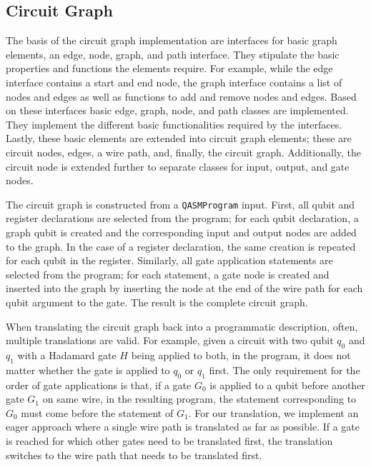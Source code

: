 \subsection{Circuit Graph}
The basis of the circuit graph implementation are interfaces for basic graph elements, \ie an edge, node, graph, and path interface. They stipulate the basic properties and functions the elements require. For example, while the edge interface contains a start and end node, the graph interface contains a list of nodes and edges as well as functions to add and remove nodes and edges. Based on these interfaces basic edge, graph, node, and path classes are implemented. They implement the different basic functionalities required by the interfaces. Lastly, these basic elements are extended into circuit graph elements; these are circuit nodes, edges, a wire path, and, finally, the circuit graph. Additionally, the circuit node is extended further to separate classes for input, output, and gate nodes.

The circuit graph is constructed from a \texttt{QASMProgram} input. First, all qubit and register declarations are selected from the program; for each qubit declaration, a graph qubit is created and the corresponding input and output nodes are added to the graph. In the case of a register declaration, the same creation is repeated for each qubit in the register. Similarly, all gate application statements are selected from the program; for each statement, a gate node is created and inserted into the graph by inserting the node at the end of the wire path for each qubit argument to the gate. The result is the complete circuit graph. 

When translating the circuit graph back into a programmatic description, often, multiple translations are valid. For example, given a circuit with two qubit $q_0$ and $q_1$ with a Hadamard gate $H$ being applied to both, in the program, it does not matter whether the gate is applied to $q_0$ or $q_1$ first. The only requirement for the order of gate applications is that, if a gate $G_0$ is applied to a qubit before another gate $G_1$ on same wire, in the resulting program, the statement corresponding to $G_0$ must come before the statement of $G_1$. For our translation, we implement an eager approach where a single wire path is translated as far as possible. If a gate is reached for which other gates need to be translated first, the translation switches to the wire path that needs to be translated first. 

